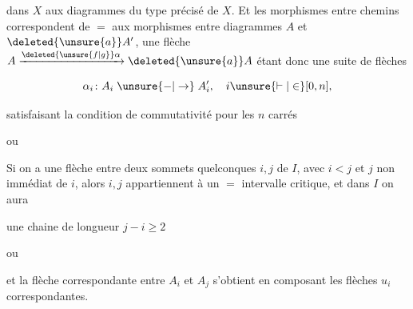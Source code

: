 
dans $X$ aux diagrammes du type précisé de $X$. Et les morphismes entre chemins correspondent de $=$ aux morphismes entre diagrammes $A$ et $\deleted{\unsure{a}}A'$, une flèche $A\xrightarrow{\deleted{\unsure{f|g}}\alpha}\deleted{\unsure{a}}A$ étant donc  une suite de  flèches

\[
\alpha_i\colon A_i\mathrel{\unsure{-|\to}}A'_i,\quad i\unsure{\vdash|\in}[0,n],
\]

satisfaisant la condition de commutativité pour les $n$ carrés


ou


Si on a une flèche entre deux sommets quelconques $i,j$ de $I$, avec $i<j$ et $j$ non  immédiat de $i$, alors $i,j$ appartiennent à un $=$ intervalle critique, et dans $I$ on aura


une chaine de  longueur $j-i\geq 2$

ou


et la flèche correspondante entre $A_i$ et $A_j$ s'obtient en composant les flèches $u_i$ correspondantes.

